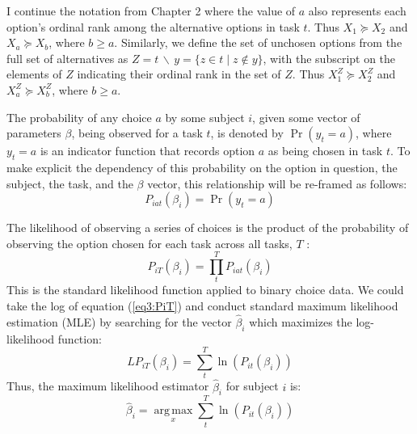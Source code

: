 \documentclass[../main.tex]{subfiles}
\begin{document}
I continue the notation from Chapter 2 where the value of $a$ also represents each option's ordinal rank among the alternative options in task $t$.
Thus $X_1 \succcurlyeq X_2$ and $X_a \succcurlyeq X_b$, where $b \geq a$.
Similarly, we define the set of unchosen options from the full set of alternatives as $Z = t \,\backslash\, y = \{z \in t \;|\; z \notin y \}$, with the subscript on the elements of $Z$ indicating their ordinal rank in the set of $Z$.
Thus $X_1^Z \succcurlyeq X_2^Z$ and $X_a^Z \succcurlyeq X_b^Z$, where $b \geq a$.

The probability of any choice $a$ by some subject $i$, given some vector of parameters $\beta$, being observed for a task $t$, is denoted by $\Pr( y_t = a)$, where $y_t = a$ is an indicator function that records option $a$ as being chosen in task $t$.
To make explicit the dependency of this probability on the option in question, the subject, the task, and the $\beta$ vector, this relationship will be re-framed as follows:
\begin{equation}
	\label{eq3:Piat}
	P_{iat}(\beta_i) = \Pr(y_t = a)
\end{equation}

The likelihood of observing a series of choices is the product of the probability of observing the option chosen for each task across all tasks, $T$ :
\begin{equation}
	\label{eq3:PiT}
	P_{iT}(\beta_i) =  \prod_{t}^{T} P_{iat}(\beta_i)
\end{equation}
\noindent This is the standard likelihood function applied to binary choice data.
We could take the log of equation (\ref{eq3:PiT}) and conduct standard maximum likelihood estimation (MLE) by searching for the vector $\hat{\beta}_i$ which maximizes the log-likelihood function:
\begin{equation}
	\label{eq3:LPiT}
	\mathit{LP}_{iT}(\beta_i) = \sum_{t}^{T} \ln \left( P_{it}(\beta_i) \right)
\end{equation}
\noindent Thus, the maximum likelihood estimator $\hat{\beta}_i$ for subject $i$ is:
\begin{equation}
	\label{eq3:Bn}
	\hat{\beta}_i = \underset{x}{\operatorname{arg\,max}}\sum_t^T \ln \left( P_{it}(\beta_i) \right)
\end{equation}
\end{document}

